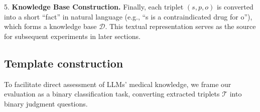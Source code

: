 5. \textbf{Knowledge Base Construction.} Finally, each triplet $(s,p,o)$ is converted into a short  ``fact'' in natural language (e.g., ``s is a contraindicated drug for o''), which forms a knowledge base $\mathcal{D}$. This textual representation serves as the source for subsequent experiments in later sections.







\subsection{Template construction}
\label{sec:data_temp}
To facilitate direct assessment of LLMs' medical knowledge, we frame our evaluation as a binary classification task, converting extracted triplets $\mathcal{T}$ into binary judgment questions.

